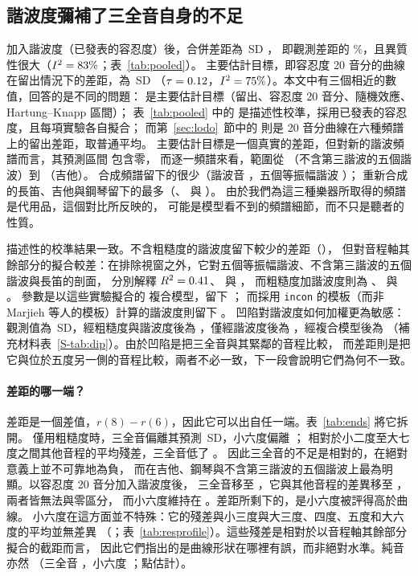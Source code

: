 \documentclass[11pt,a4paper]{article}
\newcommand{\SDu}{\,SD}
\begin{document}
\subsection{諧波度彌補了三全音自身的不足}
\label{sec:harmonicity}
加入諧波度（已發表的容忍度）後，合併差距為 \poolGapHKHHarm\SDu{} \poolGapHKHHarmCI，
即觀測差距的 \poolLeftHKH\%，且異質性很大（$I^2=83\%$；表~\ref{tab:pooled}）。
主要估計目標，即容忍度 20 音分的曲線在留出情況下的差距，為 \primGap\SDu{} \primGapCI{}
（$\tau=0.12$，$I^2=75\%$）。本文中有三個相近的數值，回答的是不同的問題：
\primGap{} 是主要估計目標（留出、容忍度 20 音分、隨機效應、Hartung--Knapp 區間）；
表~\ref{tab:pooled} 中的 \poolGapHKHHarm{} 是描述性校準，採用已發表的容忍度，且每項實驗各自擬合；
而第~\ref{sec:lodo}~節中的 \mbGapHKHtw{} 則是 20 音分曲線在六種頻譜上的留出差距，取普通平均。
主要估計目標是一個真實的差距，但對新的諧波頻譜而言，其預測區間 \primGapPI{} 包含零，
而逐一頻譜來看，範圍從 \primNothree{}（不含第三諧波的五個諧波）到 \primGuitar{}（吉他）。
合成頻譜留下的很少（諧波音 \primHarm，五個等振幅諧波 \primEqfive）；
重新合成的長笛、吉他與鋼琴留下的最多（\primFlute、\primGuitar{} 與 \primPiano）。
由於我們為這三種樂器所取得的頻譜是代用品，這個對比所反映的，
可能是模型看不到的頻譜細節，而不只是聽者的性質。

描述性的校準結果一致。不含粗糙度的諧波度留下較少的差距（\poolGapHHarm），
但對音程軸其餘部分的擬合較差：在排除視窗之外，它對五個等振幅諧波、不含第三諧波的五個諧波與長笛的剖面，
分別解釋 $R^2=0.41$、\rfitHNothree{} 與 \rfitHFlute{}，
而粗糙度加諧波度則為 \rfitHKHEqfive、\rfitHKHNothree{} 與 \rfitHKHFlute。
參數是以這些實驗擬合的 \citet{marjieh2024} 複合模型，留下 \poolGapCompHarm；
而採用 \texttt{incon} 的模板（而非 Marjieh 等人的模板）計算的諧波度則留下 \poolGapInconHarm。
凹陷對諧波度如何加權更為敏感：觀測值為 \poolDipObsHarm\SDu，經粗糙度與諧波度後為
\poolDipHKHHarm{} \poolDipHKHHarmCI，僅經諧波度後為 \poolDipHHarm，經複合模型後為 \poolDipCompHarm{}
（補充材料表~\ref{S-tab:dip}）。由於凹陷是把三全音與其緊鄰的音程比較，
而差距則是把它與位於五度另一側的音程比較，兩者不必一致，下一段會說明它們為何不一致。

\paragraph{差距的哪一端？}
差距是一個差值，$r(8)-r(6)$，因此它可以出自任一端。表~\ref{tab:ends} 將它拆開。
僅用粗糙度時，三全音偏離其預測 \rpfSixHK\SDu，小六度偏離 \rpfEightHK；
相對於小二度至大七度之間其他音程的平均殘差，三全音低了 \rpfTTOtherHK。
因此三全音的不足是相對的，在絕對意義上並不可靠地為負，
而在吉他、鋼琴與不含第三諧波的五個諧波上最為明顯。以容忍度 20 音分加入諧波度後，
三全音移至 \rpfSixTw，它與其他音程的差異移至 \rpfTTOtherTw，兩者皆無法與零區分，
而小六度維持在 \rpfEightTw。差距所剩下的，是小六度被評得高於曲線。
小六度在這方面並不特殊：它的殘差與小三度與大三度、四度、五度和大六度的平均並無差異
（\rpfMsixConsTw；表~\ref{tab:resprofile}）。這些殘差是相對於以音程軸其餘部分擬合的截距而言，
因此它們指出的是曲線形狀在哪裡有誤，而非絕對水準。純音亦然
（三全音 \rpfPureTwSix，小六度 \rpfPureTwEight；點估計）。
\end{document}

